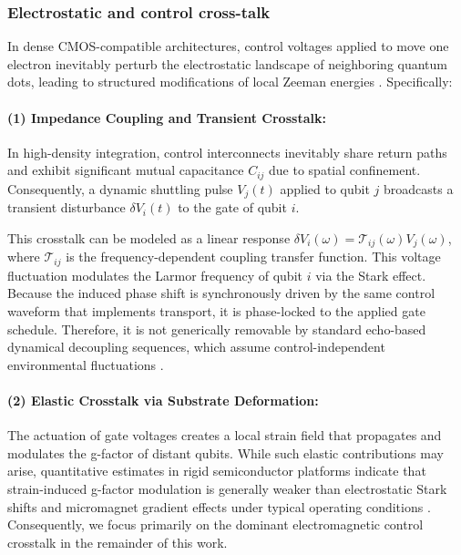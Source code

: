 \documentclass[a4paper,twocolumn,11pt]{quantumarticle}
\begin{document}
\subsubsection{Electrostatic and control cross-talk}
\label{sec:micro_source_electrostatic}

In dense CMOS-compatible architectures, control voltages applied to move one electron inevitably perturb the electrostatic landscape of neighboring quantum dots, leading to structured modifications of local Zeeman energies \cite{cifuentes_impact_2024}. Specifically:

\paragraph{(1) Impedance Coupling and Transient Crosstalk:}
In high-density integration, control interconnects inevitably share return paths and exhibit significant mutual capacitance $C_{ij}$ due to spatial confinement. Consequently, a dynamic shuttling pulse $V_j(t)$ applied to qubit $j$ broadcasts a transient disturbance $\delta V_i(t)$ to the gate of qubit $i$. 

This crosstalk can be modeled as a linear response $\delta V_i(\omega) = \mathcal{T}_{ij}(\omega) V_j(\omega)$, where $\mathcal{T}_{ij}$ is the frequency-dependent coupling transfer function. This voltage fluctuation modulates the Larmor frequency of qubit $i$ via the Stark effect. Because the induced phase shift is synchronously driven by the same control waveform that implements transport, it is phase-locked to the applied gate schedule. Therefore, it is not generically removable by standard echo-based dynamical decoupling sequences, which assume control-independent environmental fluctuations \cite{sarovar_detecting_2020, viola_dynamical_1999, buterakos_crosstalk_2018}.

\paragraph{(2) Elastic Crosstalk via Substrate Deformation:}
The actuation of gate voltages creates a local strain field that propagates and modulates the g-factor of distant qubits. While such elastic contributions may arise, quantitative estimates in rigid semiconductor platforms indicate that strain-induced g-factor modulation is generally weaker than electrostatic Stark shifts and micromagnet gradient effects under typical operating conditions \cite{tanttu_controlling_2019, laucht_electrically_2015}. Consequently, we focus primarily on the dominant electromagnetic control crosstalk in the remainder of this work. 
\end{document}

